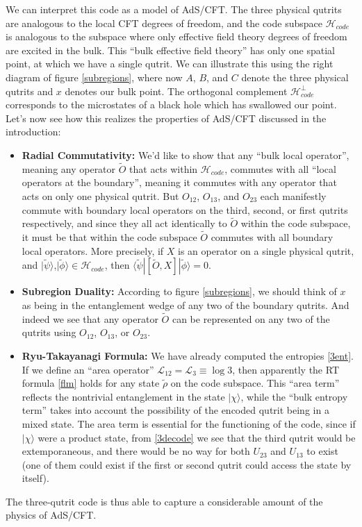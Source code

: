 \documentclass[12pt]{article}
\newcommand{\bi}{\begin{itemize}}
\newcommand{\ei}{\end{itemize}}
\newcommand{\lan}{\langle}
\newcommand{\ran}{\rangle}
\newcommand{\wt}{\widetilde}
\newcommand{\Ll}{\mathcal{L}}
\newcommand{\Hc}{\mathcal{H}_{code}}
\begin{document}
We can interpret this code as a model of AdS/CFT.  The three physical qutrits are analogous to the local CFT degrees of freedom, and the code subspace $\Hc$ is analogous to the subspace where only effective field theory degrees of freedom are excited in the bulk.  This ``bulk effective field theory'' has only one spatial point, at which we have a single qutrit.  We can illustrate this using the right diagram of figure \ref{subregions}, where now $A$, $B$, and $C$ denote the three physical qutrits and $x$ denotes our bulk point.  The orthogonal complement $\Hc^\perp$  corresponds to the microstates of a black hole which has swallowed our point.  Let's now see how this realizes the properties of AdS/CFT discussed in the introduction:
\bi
\item \textbf{Radial Commutativity:}  We'd like to show that any ``bulk local operator'', meaning any operator $\wt{O}$ that acts within $\Hc$, commutes with all ``local operators at the boundary'', meaning it commutes with any operator that acts on only one physical qutrit. But $O_{12}$, $O_{13}$, and $O_{23}$ each manifestly commute with boundary local operators on the third, second, or first qutrits respectively, and since they all act identically to $\wt{O}$ within the code subspace, it must be that within the code subspace $\wt{O}$ commutes with all boundary local operators. More precisely, if $X$ is an operator on a single physical qutrit, and $|\wt{\psi}\ran$,$|\wt{\phi}\ran \in \Hc$, then $\lan \wt{\psi}|[\wt{O},X]|\wt{\phi}\ran=0$.
\item \textbf{Subregion Duality:} According to figure \ref{subregions}, we should think of $x$ as being in the entanglement wedge of any two of the boundary qutrits.  And indeed we see that any operator $\wt{O}$ can be represented on any two of the qutrits using $O_{12}$, $O_{13}$, or $O_{23}$.
\item \textbf{Ryu-Takayanagi Formula:} We have already computed the entropies \eqref{3ent}. If we define an ``area operator'' $\Ll_{12}=\Ll_{3}\equiv \log 3$, then apparently the RT formula \eqref{flm} holds for any state $\wt{\rho}$ on the code subspace.  This ``area term'' reflects the nontrivial entanglement in the state $|\chi\ran$, while the ``bulk entropy term'' takes into account the possibility of the encoded qutrit being in a mixed state.  The area term is essential for the functioning of the code, since if $|\chi\ran$ were a product state, from \eqref{3decode} we see that the third qutrit would be extemporaneous, and there would be no way for both $U_{23}$ and $U_{13}$ to exist (one of them could exist if the first or second qutrit could access the state by itself).  
\ei 
The three-qutrit code is thus able to capture a considerable amount of the physics of AdS/CFT.  
\end{document}
